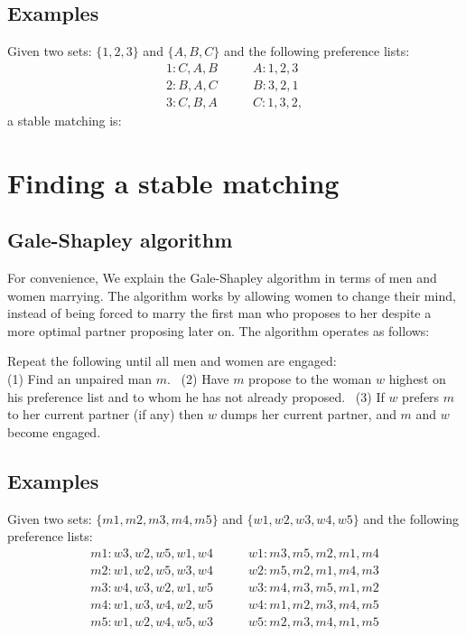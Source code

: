\documentclass[11pt]{article}
\begin{document}
\subsection{Examples}

Given two sets: $\{1,2,3\}$ and $\{A,B,C\}$ and the following preference lists:
\begin{align*}
	1: C,A,B&\qquad A: 1,2,3\\
	2: B,A,C&\qquad B: 3,2,1\\
	3: C,B,A&\qquad C: 1,3,2,
\end{align*}
a stable matching is:
\begin{figure}[H]
\centering

\end{figure}


\section{Finding a stable matching}

\subsection{Gale-Shapley algorithm}

For convenience, We explain the Gale-Shapley algorithm in terms of men and women marrying.
The algorithm works by allowing women to change their mind, instead of being forced to marry the first man who proposes to her despite a more optimal partner proposing later on.
The algorithm operates as follows:

\noindent
Repeat the following until all men and women are engaged:\\ (1) Find an unpaired man $m$.
\ (2) Have $m$ propose to the woman $w$ highest on his preference list and to whom he has not already proposed.
\ (3) If $w$ prefers $m$ to her current partner (if any) then $w$ dumps her current partner, and $m$ and $w$ become engaged.


\subsection{Examples}

Given two sets: $\{m1,m2,m3,m4,m5\}$ and $\{w1,w2,w3,w4,w5\}$ and the following preference lists:
\begin{align*}
	m1: w3,w2,w5,w1,w4&\qquad w1: m3,m5,m2,m1,m4\\
	m2: w1,w2,w5,w3,w4&\qquad w2: m5,m2,m1,m4,m3\\
	m3: w4,w3,w2,w1,w5&\qquad w3: m4,m3,m5,m1,m2\\
	m4: w1,w3,w4,w2,w5&\qquad w4: m1,m2,m3,m4,m5\\
	m5: w1,w2,w4,w5,w3&\qquad w5: m2,m3,m4,m1,m5
\end{align*}
\end{document}
